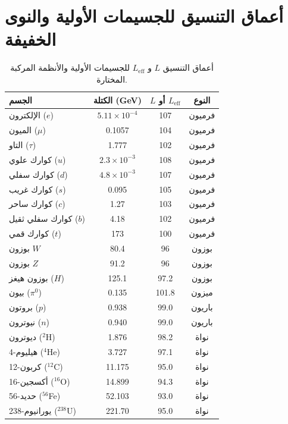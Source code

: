 \documentclass[12pt,a4paper]{article}
\begin{document}
	\section*{أعماق التنسيق للجسيمات الأولية والنوى الخفيفة}
	\begin{otherlanguage}{english}   %
		\begin{table}[H]
			\centering
			\caption{أعماق التنسيق \(L\) و \(L_{\mathrm{eff}}\) للجسيمات الأولية والأنظمة المركبة المختارة.}
			\label{tab:depths_particles}
			\small
			\begin{tabular}{l c c c}
				\toprule
				\textbf{الجسم} & \textbf{الكتلة (GeV)} & \textbf{\(L\) أو \(L_{\mathrm{eff}}\)} & \textbf{النوع} \\
				\midrule
				الإلكترون (\(e\)) & \(5.11\times10^{-4}\) & 107 & فرميون \\
				الميون (\(\mu\)) & 0.1057 & 104 & فرميون \\
				التاو (\(\tau\)) & 1.777 & 102 & فرميون \\
				كوارك علوي (\(u\)) & \(2.3\times10^{-3}\) & 108 & فرميون \\
				كوارك سفلي (\(d\)) & \(4.8\times10^{-3}\) & 107 & فرميون \\
				كوارك غريب (\(s\)) & 0.095 & 105 & فرميون \\
				كوارك ساحر (\(c\)) & 1.27 & 103 & فرميون \\
				كوارك سفلي ثقيل (\(b\)) & 4.18 & 102 & فرميون \\
				كوارك قمي (\(t\)) & 173 & 100 & فرميون \\
				بوزون \(W\) & 80.4 & 96 & بوزون \\
				بوزون \(Z\) & 91.2 & 96 & بوزون \\
				بوزون هيغز (\(H\)) & 125.1 & 97.2 & بوزون \\
				بيون (\(\pi^0\)) & 0.135 & 101.8 & ميزون \\
				بروتون (\(p\)) & 0.938 & 99.0 & باريون \\
				نيوترون (\(n\)) & 0.940 & 99.0 & باريون \\
				ديوترون (\(^2\)H) & 1.876 & 98.2 & نواة \\
				هيليوم-4 (\(^4\)He) & 3.727 & 97.1 & نواة \\
				كربون-12 (\(^{12}\)C) & 11.175 & 95.0 & نواة \\
				أكسجين-16 (\(^{16}\)O) & 14.899 & 94.3 & نواة \\
				حديد-56 (\(^{56}\)Fe) & 52.103 & 93.0 & نواة \\
				يورانيوم-238 (\(^{238}\)U) & 221.70 & 95.0 & نواة \\
				\bottomrule
			\end{tabular}
		\end{table}
	\end{otherlanguage}
	
\end{document}
